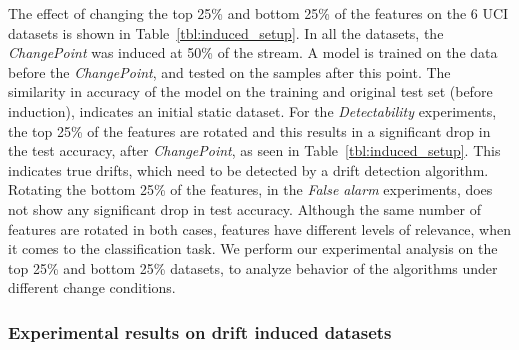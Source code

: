 \documentclass[authoryear,3p,times,twocolumn]{elsarticle}
\begin{document}
The effect of changing the top 25\% and bottom 25\% of the features on the 6 UCI datasets is shown in Table~\ref{tbl:induced_setup}. In all the datasets, the \textit{ChangePoint} was induced at 50\% of the stream. A model is trained on the data before the \textit{ChangePoint}, and tested on the samples after this point. The similarity in accuracy of the model on the training and original test set (before induction), indicates an initial static dataset. For the \textit{Detectability} experiments, the top 25\% of the features are rotated and this results in a significant drop in the test accuracy, after \textit{ChangePoint}, as seen in Table~\ref{tbl:induced_setup}. This indicates true drifts, which need to be detected by a drift detection algorithm. Rotating the bottom 25\% of the features, in the \textit{False alarm} experiments, does not show any significant drop in test accuracy. Although the same number of features are rotated in both cases, features have different levels of relevance, when it comes to the classification task. We perform our experimental analysis on the top 25\% and bottom 25\% datasets, to analyze behavior of the algorithms under different change conditions.

\subsubsection{Experimental results on drift induced datasets}
\label{sec:results_induced}
\end{document}
